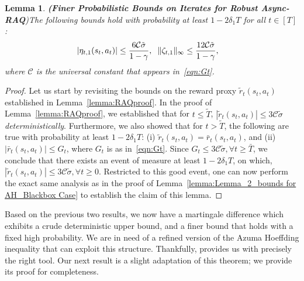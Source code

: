 \documentclass{article}
\newcommand{\mc}{\mathcal}
\newtheorem{lemma}{Lemma}
\begin{document}
\begin{lemma}\textbf{(Finer Probabilistic Bounds on Iterates for Robust Async-RAQ})\label{lemma:prob_bound_iterates_raq}
The following bounds hold with probability at least $1- 2 \delta_1 T$ for all \(t \in [T]\):
\begin{align}
    \lvert\eta_{t,1}(s_t, a_t)\rvert &\le \frac{6 \mc{C} \tilde{\sigma}}{1-\gamma}, \hspace{2 mm} \Vert \zeta_{t,1} \Vert_{\infty} \le \frac{12 \mc{C} \tilde{\sigma}}{1-\gamma},
\end{align}
where $\mc{C}$ is the universal constant that appears in~\eqref{eqn:Gt}.
\end{lemma}
\begin{proof} Let us start by revisiting the bounds on the reward proxy $\tilde{r}_t(s_t,a_t)$ established in Lemma~\ref{lemma:RAQproof}. In the proof of Lemma~\ref{lemma:RAQproof}, we established that for $t \leq \tilde{T}$, $|\tilde{r}_t(s_t, a_t)| \leq 3 \mc{C} \tilde{\sigma}$ \emph{deterministically}. Furthermore, we also showed that for $t > \tilde{T}$, the following are true with probability at least $1- 2 \delta_1 T$: (i) $\tilde{r}_t(s_t, a_t) = \bar{r}_t(s_t, a_t)$, and (ii) $|\bar{r}_t(s_t, a_t)| \leq G_t$, where $G_t$ is as in~\eqref{eqn:Gt}. Since $G_t \leq 3 \mc{C} \tilde{\sigma}, \forall t \geq \bar{T}$, we conclude that there exists an event of measure at least $1-2 \delta_1 T$, on which, $|\tilde{r}_t(s_t, a_t)| \leq 3 \mc{C} \tilde{\sigma}, \forall t \geq 0$. Restricted to this good event, one can now perform the exact same analysis as in the proof of Lemma~\ref{lemma:Lemma_2_bounds for AH_Blackbox Case} to establish the claim of this lemma. 
\end{proof}

Based on the previous two results, we now have a martingale difference which exhibits a crude deterministic upper bound, and a finer bound that holds with a fixed high probability. We are in need of a refined version of the Azuma Hoeffding inequality that can exploit this structure. Thankfully, \citep[Theorem 7]{Shamir1987} provides us with precisely the right tool. Our next result is a slight adaptation of this theorem; we provide its proof for completeness. 

\end{document}
